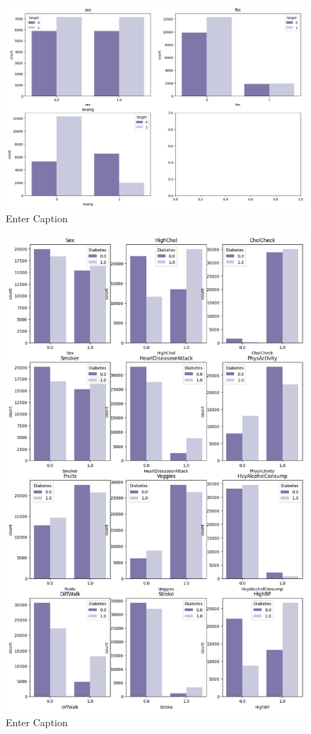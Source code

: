 \documentclass[onecolumn,12pt]{article}
\begin{document}
\begin{figure}
    \centering
    \includegraphics[width=0.9\linewidth]{raport/graphs/hypertension_binary.png}
    \caption{Enter Caption}
    \label{fig:enter-label}
\end{figure}

\begin{figure}
    \centering
    \includegraphics[width=1\linewidth]{raport/graphs/diabetes_binary.png}
    \caption{Enter Caption}
    \label{fig:enter-label}
\end{figure}
\end{document}
